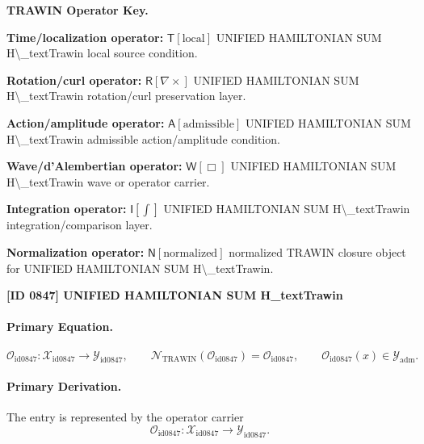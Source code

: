 \par\vspace{0.45\baselineskip}
\noindent\begin{minipage}[t]{\linewidth}
\begingroup
\small
\raggedright
\textbf{TRAWIN Operator Key.}\par
\noindent\textbf{Time/localization operator:} $\mathsf{T}\!\left[\mathrm{local}\right]$ UNIFIED HAMILTONIAN SUM H\textbackslash{}\_textTrawin local source condition.\par
\noindent\textbf{Rotation/curl operator:} $\mathsf{R}\!\left[\nabla\times\right]$ UNIFIED HAMILTONIAN SUM H\textbackslash{}\_textTrawin rotation/curl preservation layer.\par
\noindent\textbf{Action/amplitude operator:} $\mathsf{A}\!\left[\mathrm{admissible}\right]$ UNIFIED HAMILTONIAN SUM H\textbackslash{}\_textTrawin admissible action/amplitude condition.\par
\noindent\textbf{Wave/d'Alembertian operator:} $\mathsf{W}\!\left[\Box\right]$ UNIFIED HAMILTONIAN SUM H\textbackslash{}\_textTrawin wave or operator carrier.\par
\noindent\textbf{Integration operator:} $\mathsf{I}\!\left[\int\right]$ UNIFIED HAMILTONIAN SUM H\textbackslash{}\_textTrawin integration/comparison layer.\par
\noindent\textbf{Normalization operator:} $\mathsf{N}\!\left[\mathrm{normalized}\right]$ normalized TRAWIN closure object for UNIFIED HAMILTONIAN SUM H\textbackslash{}\_textTrawin.\par
\endgroup
\end{minipage}

\clearpage
\noindent\textbf{[ID 0847] UNIFIED HAMILTONIAN SUM H\_textTrawin}\par
\vspace{0.35em}
\paragraph{Primary Equation.}
\[
\mathcal{O}_{\mathrm{id0847}}:\mathcal{X}_{\mathrm{id0847}}\longrightarrow \mathcal{Y}_{\mathrm{id0847}},\qquad
\mathcal{N}_{\mathrm{TRAWIN}}(\mathcal{O}_{\mathrm{id0847}})=\mathcal{O}_{\mathrm{id0847}},\qquad
\mathcal{O}_{\mathrm{id0847}}(x)\in\mathcal{Y}_{\mathrm{adm}}.
\]

\paragraph{Primary Derivation.} The entry is represented by the operator carrier\[
\mathcal{O}_{\mathrm{id0847}}:\mathcal{X}_{\mathrm{id0847}}\longrightarrow \mathcal{Y}_{\mathrm{id0847}}.
\]

